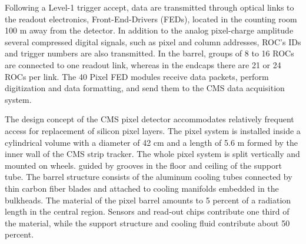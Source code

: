 Following a Level-1 trigger accept, data are transmitted through optical 
links to the readout 
electronics, Front-End-Drivers (FEDs), located in the counting room 100 m 
away from the detector. 
In addition to the analog pixel-charge amplitude several compressed 
digital signals, such 
as pixel and column addresses, ROC's IDs and trigger numbers are also 
transmitted. 
In the barrel, groups of 8 to 16 ROCs are connected to one readout link, 
whereas in the endcaps
there are 21 or 24 ROCs per link. 
The 40 Pixel FED modules receive data packets, perform digitization and 
data formatting, 
and send them to the CMS data acquisition system.

The design concept of the CMS pixel detector accommodates relatively 
frequent access for 
replacement of silicon pixel layers.
The pixel system is installed inside a cylindrical volume with a diameter 
of 42 cm and 
a length of 5.6 m formed by the inner wall of the CMS strip tracker. The 
whole pixel 
system is split vertically and mounted on wheels. guided by grooves in the 
floor and ceiling 
of the support tube. The barrel structure consists of the aluminum cooling 
tubes connected
by thin carbon fiber blades and attached to cooling manifolds embedded in 
the bulkheads.
The material of the pixel barrel amounts to 5 percent of a radiation 
length in the central region.
Sensors and read-out chips contribute one third of the material, while the 
support structure
and cooling fluid contribute about 50 percent.


